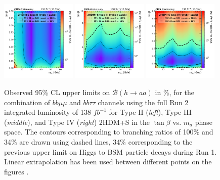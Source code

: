 \begin{figure}[ht]
    \begin{center}
      \includegraphics[width=0.32\textwidth]{figures/ch-13-results/HAA_comb_II_prelim.pdf}
      \includegraphics[width=0.32\textwidth]{figures/ch-13-results/HAA_comb_III_prelim.pdf}
      \includegraphics[width=0.32\textwidth]{figures/ch-13-results/HAA_comb_IV_prelim.pdf}
    \end{center}
    \caption[Observed 95\% CL upper limits on $\mathcal{B}(h\to aa)$ in \%, for the combination of $bb\mu\mu$ and $bb\tau\tau$ channels using the full Run 2 integrated luminosity of 138 $fb^{-1}$ for Type II (\textit{left}), Type III (\textit{middle}), and Type IV (\textit{right}) 2HDM+S in the $\tan\beta$ vs. $m_a$ phase space.]{Observed 95\% CL upper limits on $\mathcal{B}(h\to aa)$ in \%, for the combination of $bb\mu\mu$ and $bb\tau\tau$ channels using the full Run 2 integrated luminosity of 138 $fb^{-1}$ for Type II (\textit{left}), Type III (\textit{middle}), and Type IV (\textit{right}) 2HDM+S in the $\tan\beta$ vs. $m_a$ phase space. The contours corresponding to branching ratios of 100\% and 34\% are drawn using dashed lines, 34\% corresponding to the previous upper limit on Higgs to BSM particle decays during Run 1. Linear extrapolation has been used between different points on the figures \cite{CMS-AN-20-213}.}
      \label{fig:results_limits_combined_2D}
  \end{figure}
  
